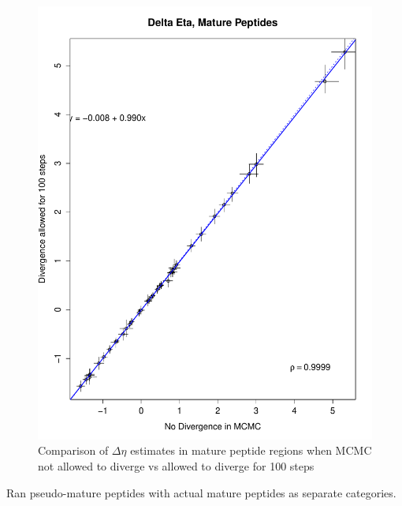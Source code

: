 \documentclass[11pt]{labbook}
\begin{document}
\begin{figure}[H]
\centering
\includegraphics[page=1,scale=0.6]{Ecoli_results/Nosp_w_mp_cat_divergence_100/Graphs/Comp_mp_no_divergence_to_divergence_100.pdf}
\caption{Comparison of $\Delta\eta$ estimates in mature peptide regions when MCMC not allowed to diverge vs allowed to diverge for 100 steps}
\end{figure}

Ran pseudo-mature peptides with actual mature peptides as separate categories. 
\end{document}
